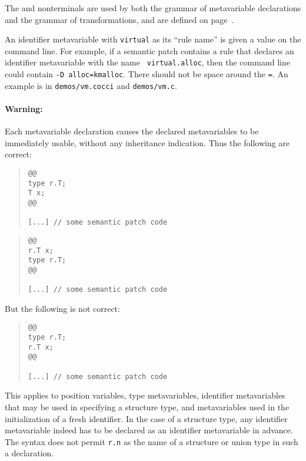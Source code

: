 The  and  nonterminals are used by both the grammar of
metavariable declarations and the grammar of transformations, and are
defined on page~\pageref{types}.

An identifier metavariable with {\tt virtual} as its ``rule name'' is given
a value on the command line.  For example, if a semantic patch contains a
rule that declares an identifier metavariable with the name {\tt
  virtual.alloc}, then the command line could contain {\tt -D
  alloc=kmalloc}.  There should not be space around the {\tt =}.  An
example is in {\tt demos/vm.cocci} and {\tt demos/vm.c}.


\paragraph*{Warning:} Each metavariable declaration causes the declared
metavariables to be immediately usable, without any inheritance
indication.  Thus the following are correct:

\begin{quote}
\begin{verbatim}
@@
type r.T;
T x;
@@

[...] // some semantic patch code
\end{verbatim}
\end{quote}

\begin{quote}
\begin{verbatim}
@@
r.T x;
type r.T;
@@

[...] // some semantic patch code
\end{verbatim}
\end{quote}

\noindent
But the following is not correct:

\begin{quote}
\begin{verbatim}
@@
type r.T;
r.T x;
@@

[...] // some semantic patch code
\end{verbatim}
\end{quote}

This applies to position variables, type metavariables, identifier
metavariables that may be used in specifying a structure type, and
metavariables used in the initialization of a fresh identifier.  In the
case of a structure type, any identifier metavariable indeed has to be
declared as an identifier metavariable in advance.  The syntax does not
permit {\tt r.n} as the name of a structure or union type in such a
declaration.

